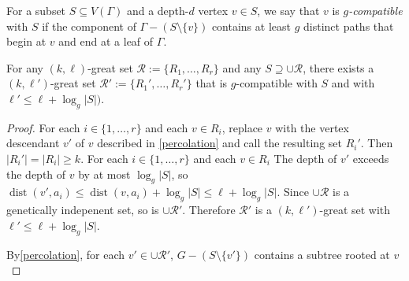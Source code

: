 \documentclass{patmorin}
\newcommand{\defin}[1]{\emph{\color{brightmaroon}#1}}
\DeclareMathOperator{\dist}{dist}
\begin{document}
For a subset $S\subseteq V(\Gamma)$ and a depth-$d$ vertex $v\in S$, we say that $v$ is \defin{$g$-compatible} with $S$ if the component of $\Gamma-(S\setminus\{v\})$ contains at least $g$ distinct paths that begin at $v$ and end at a leaf of $\Gamma$.  

\begin{lem}\label{compatible_set}
  For any $(k,\ell)$-great set $\mathcal{R}:=\{R_1,\ldots,R_r\}$ and any $S\supseteq \cup\mathcal{R}$, there exists a $(k,\ell')$-great set $\mathcal{R}':=\{R_1',\ldots,R_r'\}$ that is $g$-compatible with $S$ and with $\ell'\le \ell+\log_g|S|)$.
\end{lem}

\begin{proof}
  For each $i\in\{1,\ldots,r\}$ and each $v\in R_i$, replace $v$ with the vertex descendant $v'$ of $v$ described in \cref{percolation} and call the resulting set $R_i'$.   Then $|R_i'|=|R_i|\ge k$.  For each $i\in\{1,\ldots,r\}$ and each $v\in R_i$ The depth of $v'$ exceeds the depth of $v$ by at most $\log_g|S|$, so $\dist(v',a_i)\le \dist(v,a_i)+\log_g|S|\le \ell+\log_g|S|$. Since $\cup\mathcal{R}$ is a genetically indepenent set, so is $\cup\mathcal{R}'$.  Therefore $\mathcal{R}'$ is a $(k,\ell')$-great set with $\ell'\le \ell+\log_g|S|$.

  By\cref{percolation}, for each $v'\in \cup\mathcal{R}'$, $G-(S\setminus\{v'\})$ contains a subtree rooted at $v$ 
\end{proof}

\end{document}
